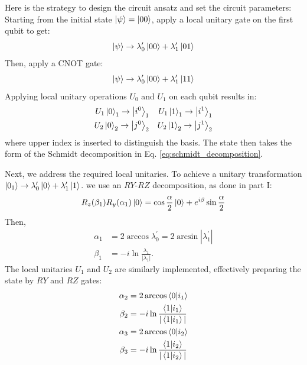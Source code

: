 \documentclass[a4paper, 11pt]{article}
\begin{document}
Here is the strategy to design the circuit ansatz and set the circuit parameters:
Starting from the initial state $\ket{\psi} = \ket{00}$, apply a local unitary gate on the first qubit to get:
\begin{equation}
  \ket{\psi}\rightarrow \lambda^{\prime}_0 \ket{00} + \lambda^{\prime}_{1} \ket{01}
\end{equation}
Then, apply a CNOT gate:
\begin{equation}
  \ket{\psi}\rightarrow \lambda^{\prime}_0 \ket{00} + \lambda^{\prime}_{1} \ket{11}
\end{equation}
Applying local unitary operations $U_0$ and $U_1$ on each qubit results in:
\begin{align}
  U_1 \ket{0}_{1} \rightarrow \ket{i^{0}}_{1} && U_1 \ket{1}_{1} \rightarrow \ket{i^{1}}_{1} \label{eq:local_unitary_schmidt1} \\
  U_2 \ket{0}_{2} \rightarrow \ket{j^{0}}_{2} && U_2 \ket{1}_{2} \rightarrow \ket{j^{1}}_{2} \label{eq:local_unitary_schmidt2}
\end{align}
where upper index is inserted to distinguish the basis.
The state then takes the form of the Schmidt decomposition in Eq. \ref{eq:schmidt_decomposition}.

Next, we address the required local unitaries. To achieve a unitary transformation $\ket{0_{1}} \rightarrow \lambda^{\prime}_0 \ket{0} + \lambda^{\prime}_{1} \ket{1}$.
we use an $RY$-$RZ$ decomposition, as done in part I:
\begin{align}
  R_{z}(\beta_{1}) R_{y}(\alpha_{1})\ket{0} = \cos\frac{\alpha}{2} \ket{0} + e^{i\beta} \sin\frac{\alpha}{2}
\end{align}
Then,
\begin{align}
  \alpha_{1} &= 2\arccos \lambda^{\prime}_{0} = 2\arcsin |\lambda^{\prime}_{1}| \label{eq:2_qst_circuit_para1} \\
  \beta_{1}  &= -i \ln \frac{\lambda_{1}}{|\lambda_{1}|}.
\end{align}
The local unitaries $U_{1}$ and $U_{2}$ are similarly implemented, effectively preparing the state by $RY$ and $RZ$ gates:
\begin{align}
  \alpha_{2} &= 2\arccos \bra{0}\ket{i_1} \label{eq:local_unitary_schmidt3} \\
  \beta_{2}  &= -i \ln \frac{\bra{1}\ket{i_1}}{|\bra{1}\ket{i_1}|} \label{eq:local_unitary_schmidt4} \\
  \alpha_{3} &= 2\arccos \bra{0}\ket{i_2} \label{eq:local_unitary_schmidt5} \\
  \beta_{3}  &= -i \ln \frac{\bra{1}\ket{i_2}}{|\bra{1}\ket{i_2}|} \label{eq:local_unitary_schmidt6}
\end{align}
\end{document}
